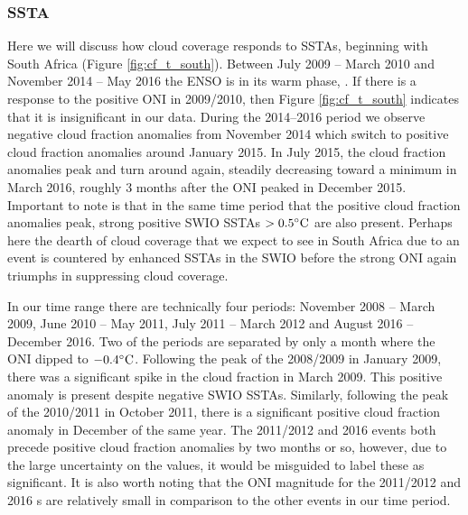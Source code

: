 \subsubsection{SSTA}
\label{sec:disc:ssta}
Here we will discuss how cloud coverage responds to SSTAs, beginning
with South Africa (Figure \ref{fig:cf_t_south}). Between July 2009 --
March 2010 and November 2014 -- May 2016 the ENSO is in its warm phase,
\elnino{}. If there is a response to the positive ONI in 2009/2010,
then Figure \ref{fig:cf_t_south} indicates that it is insignificant in
our data. During the 2014--2016 \elnino{} period we observe negative
cloud fraction anomalies from November 2014 which switch to positive
cloud fraction anomalies around January 2015. In July 2015, the cloud
fraction anomalies peak and turn around again, steadily decreasing
toward a minimum in March 2016, roughly 3 months after the ONI peaked
in December 2015. Important to note is that in the same time period
that the positive cloud fraction anomalies peak, strong positive SWIO
SSTAs $>0.5^{\circ}\mathrm{C}$ are also present. Perhaps here the dearth of cloud
coverage that we expect to see in South Africa due to an \elnino{}
event is countered by enhanced SSTAs in the SWIO before the strong ONI
again triumphs in suppressing cloud coverage.

In our time range there are technically four \nina{} periods: November
2008 -- March 2009, June 2010 -- May 2011, July 2011 -- March 2012 and
August 2016 -- December 2016. Two of the periods are separated by only
a month where the ONI dipped to $-0.4^{\circ}\mathrm{C}$. Following the peak of the
2008/2009 \nina{} in January 2009, there was a significant spike in
the cloud fraction in March 2009.  This positive anomaly is present
despite negative SWIO SSTAs. Similarly, following the peak of the
2010/2011 \nina{} in October 2011, there is a significant positive
cloud fraction anomaly in December of the same year. The 2011/2012 and
2016 \nina{} events both precede positive cloud fraction anomalies by
two months or so, however, due to the large uncertainty on the values,
it would be misguided to label these as significant. It is also worth
noting that the ONI magnitude for the 2011/2012 and 2016 \nina s are
relatively small in comparison to the other events in our time period.

